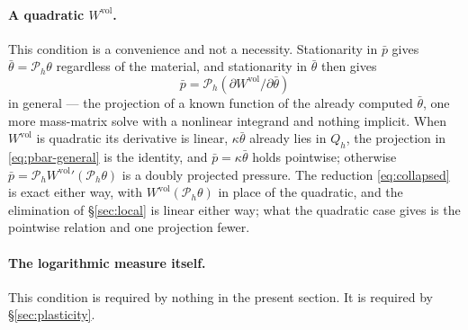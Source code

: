 \documentclass[11pt]{article}
\newcommand{\supvol}{^{\mathrm{vol}}}
\theoremstyle{definition}
\theoremstyle{plain}
\begin{document}
\paragraph{A quadratic $W\supvol$.} This condition is a convenience and not a
necessity. Stationarity in $\bar p$ gives $\bar\theta = \mathcal{P}_h\theta$ regardless of
the material, and stationarity in $\bar\theta$ then gives
\begin{equation}
  \label{eq:pbar-general}
  \bar p = \mathcal{P}_h\!\left(\partial W\supvol/\partial\bar\theta\right)
\end{equation}
in general --- the projection of a known function of the already
computed $\bar\theta$, one more mass-matrix solve with a nonlinear integrand
and nothing implicit. When $W\supvol$ is quadratic its derivative is linear,
$\kappa\bar\theta$ already lies in $Q_h$, the projection in
\eqref{eq:pbar-general} is the identity, and $\bar p = \kappa\bar\theta$ holds
pointwise; otherwise $\bar p = \mathcal{P}_h W\supvol{}'(\mathcal{P}_h\theta)$ is a
doubly projected pressure. The reduction \eqref{eq:collapsed} is exact either
way, with $W\supvol(\mathcal{P}_h\theta)$ in place of the quadratic, and the
elimination of \S\ref{sec:local} is linear either way; what the quadratic case
gives is the pointwise relation and one projection fewer.

\paragraph{The logarithmic measure itself.} This condition is required by
nothing in the present section. It is required by \S\ref{sec:plasticity}.
\end{document}
